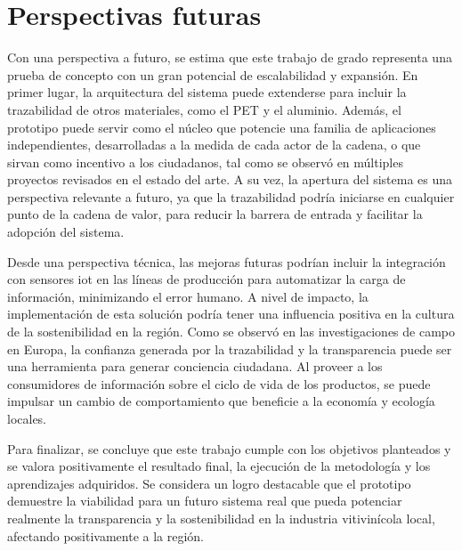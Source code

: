 \section{Perspectivas futuras}

Con una perspectiva a futuro, se estima que este trabajo de grado representa una prueba de concepto con un gran potencial de escalabilidad y expansión. En primer lugar, la arquitectura del sistema puede extenderse para incluir la trazabilidad de otros materiales, como el PET y el aluminio. Además, el prototipo puede servir como el núcleo que potencie una familia de aplicaciones independientes, desarrolladas a la medida de cada actor de la cadena, o que sirvan como incentivo a los ciudadanos, tal como se observó en múltiples proyectos revisados en el estado del arte. A su vez, la apertura del sistema es una perspectiva relevante a futuro, ya que la trazabilidad podría iniciarse en cualquier punto de la cadena de valor, para reducir la barrera de entrada y facilitar la adopción del sistema.

Desde una perspectiva técnica, las mejoras futuras podrían incluir la integración con sensores \gls{iot} en las líneas de producción para automatizar la carga de información, minimizando el error humano. A nivel de impacto, la implementación de esta solución podría tener una influencia positiva en la cultura de la sostenibilidad en la región. Como se observó en las investigaciones de campo en Europa, la confianza generada por la trazabilidad y la transparencia puede ser una herramienta para generar conciencia ciudadana. Al proveer a los consumidores de información sobre el ciclo de vida de los productos, se puede impulsar un cambio de comportamiento que beneficie a la economía y ecología locales.

Para finalizar, se concluye que este trabajo cumple con los objetivos planteados y se valora positivamente el resultado final, la ejecución de la metodología y los aprendizajes adquiridos. Se considera un logro destacable que el prototipo demuestre la viabilidad para un futuro sistema real que pueda potenciar realmente la transparencia y la sostenibilidad en la industria vitivinícola local, afectando positivamente a la región.
